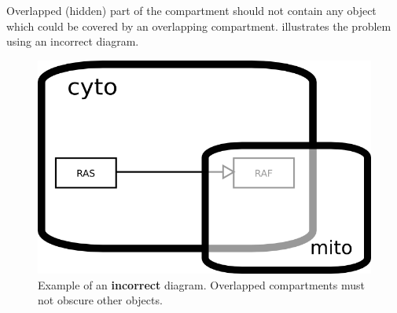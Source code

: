 Overlapped (hidden) part of the compartment should not contain any object which could be covered by an overlapping compartment.   illustrates the problem using an incorrect diagram.

\begin{figure}[H]
  \centering
  \includegraphics[scale = 0.45]{examples/compartment_overlapping_wrong.png}
  \caption{Example of an \textbf{incorrect} diagram.  Overlapped compartments must not obscure other objects.}
  \label{fig:overlap-bad}
\end{figure}

